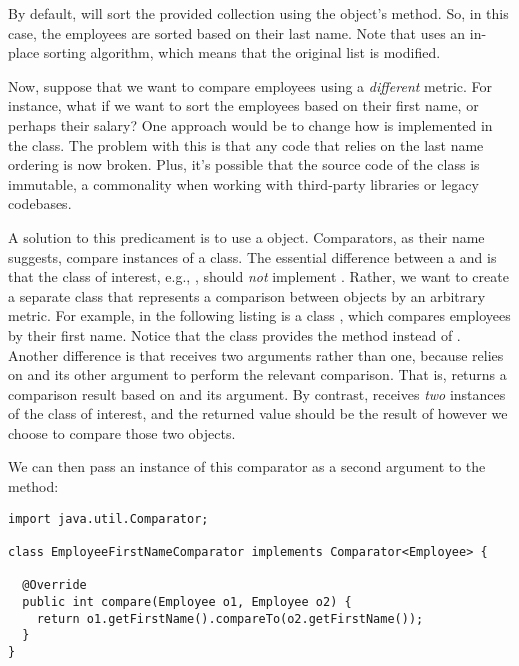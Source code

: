By default,  will sort the provided collection using the object's  method. So, in this case, the employees are sorted based on their last name. Note that  uses an in-place sorting algorithm, which means that the original list is modified.

Now, suppose that we want to compare employees using a \emph{different} metric. 
For instance, what if we want to sort the employees based on their first name, or perhaps their salary? 
One approach would be to change how  is implemented in the  class. 
The problem with this is that any code that relies on the last name ordering is now broken. 
Plus, it's possible that the source code of the  class is immutable, a commonality when working with third-party libraries or legacy codebases.

A solution to this predicament is to use a  object. 
Comparators, as their name suggests, compare instances of a class. 
The essential difference between a  and  is that the class of interest, e.g., , should \emph{not} implement . 
Rather, we want to create a separate class that represents a comparison between  objects by an arbitrary metric. 
For example, in the following listing is a class , which compares employees by their first name. 
Notice that the  class provides the  method instead of . 
Another difference is that  receives two arguments rather than one, because  relies on  and its other argument to perform the relevant comparison. 
That is,  returns a comparison result based on  and its argument. 
By contrast,  receives \emph{two} instances of the class of interest, and the returned value should be the result of however we choose to compare those two objects.

We can then pass an instance of this comparator as a second argument to the  method:

\begin{lstlisting}[language=MyJava]
import java.util.Comparator;

class EmployeeFirstNameComparator implements Comparator<Employee> {

  @Override
  public int compare(Employee o1, Employee o2) {
    return o1.getFirstName().compareTo(o2.getFirstName());
  }
}
\end{lstlisting}

